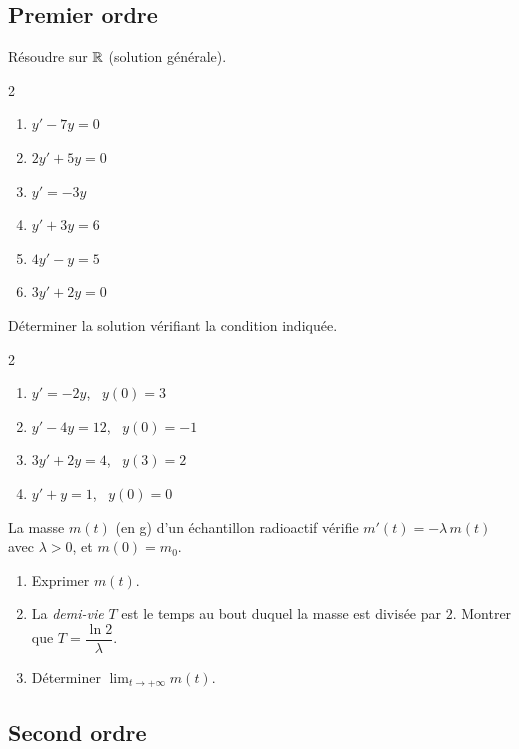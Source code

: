 \subsection{Premier ordre}

Résoudre sur $\mathbb{R}$ (solution générale).
\begin{multicols}{2}
\begin{enumerate}
	\item $y'-7y=0$
	\item $2y'+5y=0$
	\item $y'=-3y$
	\item $y'+3y=6$
	\item $4y'-y=5$
	\item $3y'+2y=0$
\end{enumerate}
\end{multicols}

Déterminer la solution vérifiant la condition indiquée.
\begin{multicols}{2}
\begin{enumerate}
	\item $y'=-2y$, \ $y(0)=3$
	\item $y'-4y=12$, \ $y(0)=-1$
	\item $3y'+2y=4$, \ $y(3)=2$
	\item $y'+y=1$, \ $y(0)=0$
\end{enumerate}
\end{multicols}

La masse $m(t)$ (en g) d'un échantillon radioactif vérifie
$m'(t)=-\lambda\,m(t)$ avec $\lambda>0$, et $m(0)=m_0$.
\begin{enumerate}
	\item Exprimer $m(t)$.
	\item La \emph{demi-vie} $T$ est le temps au bout duquel la masse est
	divisée par $2$. Montrer que $T=\dfrac{\ln 2}{\lambda}$.
	\item Déterminer $\displaystyle\lim_{t\to+\infty}m(t)$.
\end{enumerate}

\subsection{Second ordre}

